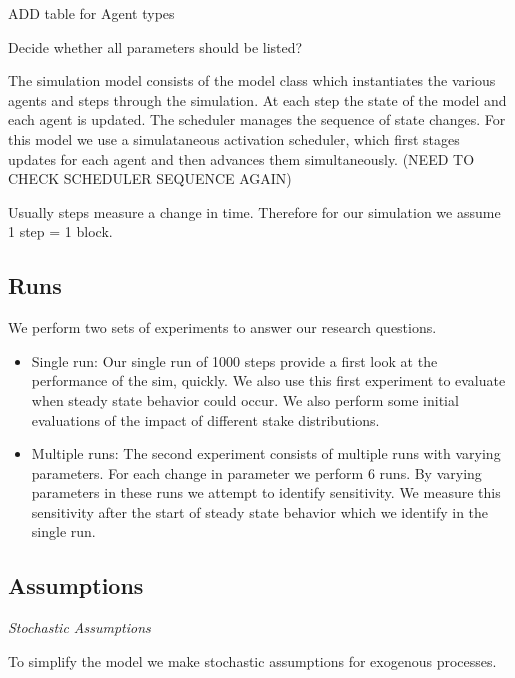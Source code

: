 \documentclass[conference]{IEEEtran}
\begin{document}
ADD table for Agent types


Decide whether all parameters should be listed?


The simulation model consists of the model class which instantiates the various agents
and steps through the simulation. At each step the state of the model and each agent
is updated. The scheduler manages the sequence of state changes. For this model we use
a simulataneous activation scheduler, which first stages updates for each agent and then 
advances them simultaneously.  (NEED TO CHECK SCHEDULER SEQUENCE AGAIN)

Usually steps measure a change in time. Therefore for our simulation we assume
1 step = 1 block.

\subsection{Runs}
We perform two sets of experiments to answer our research questions. 
\begin{itemize}

\item Single run: Our single run of 1000 steps provide a first look at the 
performance of the sim, quickly. We also use this first experiment to evaluate
when steady state behavior could occur. We also perform some initial evaluations
of the impact of different stake distributions.

\item Multiple runs: The second experiment consists of multiple runs with varying 
parameters. For each change in parameter we perform 6 runs. By varying parameters 
in these runs we attempt to identify sensitivity. We measure this sensitivity after
the start of steady state behavior which we identify in the single run. 
    
\end{itemize}

\subsection{Assumptions}

\textit{Stochastic Assumptions}

To simplify the model we make stochastic assumptions for exogenous processes.
\end{document}
